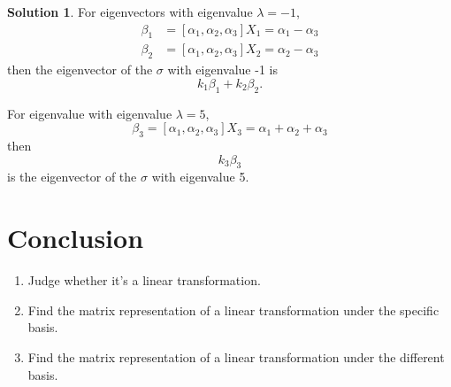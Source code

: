 \documentclass{article}
\theoremstyle{definition}
\newtheorem{sol}{Solution}[exe]
\begin{document}
\begin{sol}
    For eigenvectors with eigenvalue $\lambda=-1$,
    \begin{align*}
        \beta_{1}&=[\alpha_{1},\alpha_{2},\alpha_{3}]X_{1}=\alpha_{1}-\alpha_{3}\\
        \beta_{2}&=[\alpha_{1},\alpha_{2},\alpha_{3}]X_{2}=\alpha_{2}-\alpha_{3}
    \end{align*}
    then the eigenvector of the $\sigma$ with eigenvalue -1 is 
    $$k_{1}\beta_{1}+k_{2}\beta_{2}.$$
    
    For eigenvalue with eigenvalue $\lambda=5$,
    $$\beta_{3}=[\alpha_{1},\alpha_{2},\alpha_{3}]X_{3}=\alpha_{1}+\alpha_{2}+\alpha_{3}$$
    then $$k_{3}\beta_{3}$$ is the eigenvector of the $\sigma$ with eigenvalue 5.
\end{sol}


\section{Conclusion}
\begin{enumerate}
    \item Judge whether it's a linear transformation.
    \item Find the matrix representation of a linear transformation under the specific basis.
    \item Find the matrix representation of a linear transformation under the different basis.
\end{enumerate}
\end{document}
